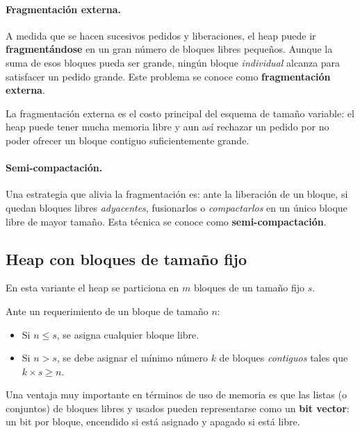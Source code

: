 \documentclass[11pt,a4paper]{article}
\begin{document}
\paragraph{Fragmentación externa.}
A medida que se hacen sucesivos pedidos y liberaciones, el heap puede
ir \textbf{fragmentándose} en un gran número de bloques libres pequeños.
Aunque la suma de esos bloques pueda ser grande, ningún bloque
\emph{individual} alcanza para satisfacer un pedido grande. Este
problema se conoce como \textbf{fragmentación externa}.

\begin{importante}
La fragmentación externa es el costo principal del esquema de tamaño
variable: el heap puede tener mucha memoria libre y aun así rechazar un
pedido por no poder ofrecer un bloque contiguo suficientemente grande.
\end{importante}

\paragraph{Semi-compactación.}
Una estrategia que alivia la fragmentación es: ante la liberación de un
bloque, si quedan bloques libres \emph{adyacentes}, fusionarlos o
\emph{compactarlos} en un único bloque libre de mayor tamaño. Esta
técnica se conoce como \textbf{semi-compactación}.

\subsection{Heap con bloques de tamaño fijo}

En esta variante el heap se particiona en $m$ bloques de un tamaño fijo
$s$.

Ante un requerimiento de un bloque de tamaño $n$:

\begin{itemize}[leftmargin=*,nosep]
    \item Si $n \leq s$, se asigna cualquier bloque libre.
    \item Si $n > s$, se debe asignar el mínimo número $k$ de bloques
        \emph{contiguos} tales que $k \times s \geq n$.
\end{itemize}

Una ventaja muy importante en términos de uso de memoria es que las
listas (o conjuntos) de bloques libres y usados pueden representarse
como un \textbf{bit vector}: un bit por bloque, encendido si está
asignado y apagado si está libre.
\end{document}
